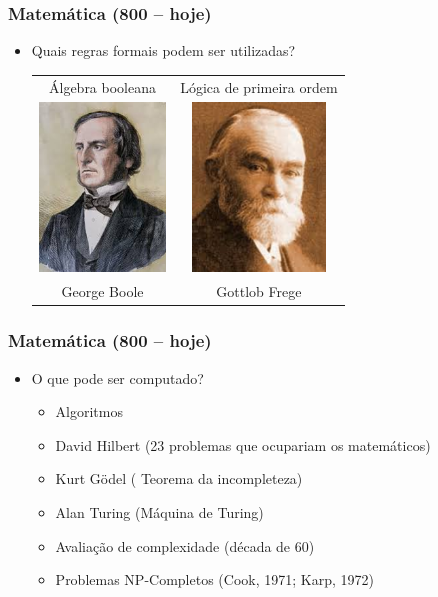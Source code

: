 \documentclass[aspectratio=169]{beamer}
\begin{document}
	\begin{frame}
		\frametitle{Matemática (800 – hoje)}
		\begin{itemize}
			\item Quais regras formais podem ser utilizadas?
			
			\begin{table}
				\centering
				\begin{tabular}{c c}
					Álgebra booleana & Lógica de primeira  ordem	\\				
					\includegraphics[height=4.5cm, keepaspectratio]{../figs/cap01/boole.png} 
					&
					\includegraphics[height=4.5cm, keepaspectratio]{../figs/cap01/frege.png} \\
					George Boole & Gottlob Frege 
					
					
				\end{tabular}
			\end{table}
		\end{itemize}
	\end{frame}

	\begin{frame}
		\frametitle{Matemática (800 – hoje)}
		\begin{itemize}
			\item O que pode ser computado?
			\begin{itemize}
				\item Algoritmos
				\item David Hilbert (23 problemas que ocupariam os matemáticos)
				\item Kurt Gödel ( Teorema da incompleteza)
				\item Alan Turing (Máquina de Turing)
				\item Avaliação de complexidade (década de 60)
				\item Problemas NP-Completos (Cook, 1971; Karp, 1972)			
			\end{itemize}
		\end{itemize}
	\end{frame}
\end{document}
